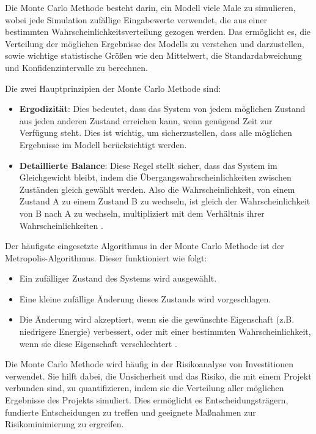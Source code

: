Die Monte Carlo Methode besteht darin, ein Modell viele Male zu simulieren, wobei jede Simulation zufällige Eingabewerte verwendet, die aus einer bestimmten Wahrscheinlichkeitsverteilung gezogen werden. Das ermöglicht es, die Verteilung der möglichen Ergebnisse des Modells zu verstehen und darzustellen, sowie wichtige statistische Größen wie den Mittelwert, die Standardabweichung und Konfidenzintervalle zu berechnen.

Die zwei Hauptprinzipien der Monte Carlo Methode sind:

\begin{itemize}
    \item \textbf{Ergodizität}: Dies bedeutet, dass das System von jedem möglichen Zustand aus jeden anderen Zustand erreichen kann, wenn genügend Zeit zur Verfügung steht. Dies ist wichtig, um sicherzustellen, dass alle möglichen Ergebnisse im Modell berücksichtigt werden.
    \item \textbf{Detaillierte Balance}: Diese Regel stellt sicher, dass das System im Gleichgewicht bleibt, indem die Übergangswahrscheinlichkeiten zwischen Zuständen gleich gewählt werden. Also die Wahrscheinlichkeit, von einem Zustand A zu einem Zustand B zu wechseln, ist gleich der Wahrscheinlichkeit von B nach A zu wechseln, multipliziert mit dem Verhältnis ihrer Wahrscheinlichkeiten \cite{Walter2014}.
\end{itemize}

Der häufigste eingesetzte Algorithmus in der Monte Carlo Methode ist der Metropolis-Algorithmus. Dieser funktioniert wie folgt:

\begin{itemize}
    \item Ein zufälliger Zustand des Systems wird ausgewählt.
    \item Eine kleine zufällige Änderung dieses Zustands wird vorgeschlagen.
    \item Die Änderung wird akzeptiert, wenn sie die gewünschte Eigenschaft (z.B. niedrigere Energie) verbessert, oder mit einer bestimmten Wahrscheinlichkeit, wenn sie diese Eigenschaft verschlechtert \cite{Walter2014}.
\end{itemize}

Die Monte Carlo Methode wird häufig in der Risikoanalyse von Investitionen verwendet. Sie hilft dabei, die Unsicherheit und das Risiko, die mit einem Projekt verbunden sind, zu quantifizieren, indem sie die Verteilung aller möglichen Ergebnisse des Projekts simuliert. Dies ermöglicht es Entscheidungsträgern, fundierte Entscheidungen zu treffen und geeignete Maßnahmen zur Risikominimierung zu ergreifen.

